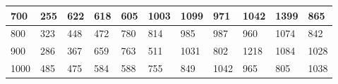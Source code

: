 \documentclass[10pt,letterpaper]{article}
\begin{document}
\begin{center}
\begin{table}
\begin{tabular} { |m{0.5cm}|m{1.3cm}|m{1.3cm}|m{1.3cm}|m{1.3cm}|m{1.3cm}|m{1.3cm}|m{1.3cm}|m{1.3cm}|m{1.3cm}|m{1.3cm}|}
\hline
\cellcolor{Gray}700 & \Large 255 & \Large 622 & \Large 618 & \Large 605 & \Large 1003 & \Large 1099 & \Large 971 & \Large 1042 & \Large 1399 & \Large 865 \\
\hline
\cellcolor{Gray}800 & \Large 323 & \Large 448 & \Large 472 & \Large 780 & \Large 814 & \Large 985 & \Large 987 & \Large 960 & \Large 1074 & \Large 842 \\
\hline
\cellcolor{Gray}900 & \Large 286 & \Large 367 & \Large 659 & \Large 763 & \Large 511 & \Large 1031 & \Large 802 & \Large 1218 & \Large 1084 & \Large 1028 \\
\hline
\cellcolor{Gray}1000 & \Large 485 & \Large 475 & \Large 584 & \Large 588 & \Large 755 & \Large 849 & \Large 1042 & \Large 965 & \Large 805 & \Large 1038 \\
\hline
\end{tabular} \\
\end{table}
\end{center}
\newpage 
{}
\end{document}
